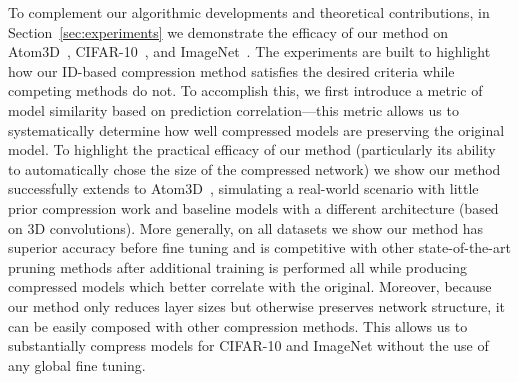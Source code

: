 To complement our algorithmic developments and theoretical contributions, in Section~\ref{sec:experiments} we demonstrate the efficacy of our method on Atom3D~\cite{atom3d}, CIFAR-10~\cite{datacifar10}, and ImageNet~\cite{deng2009imagenet}. The experiments are built to highlight how our ID-based compression method satisfies the desired criteria while competing methods do not. To accomplish this, we first introduce a metric of model similarity based on prediction correlation---this metric allows us to systematically determine how well compressed models are preserving the original model. To highlight the practical efficacy of our method (particularly its ability to automatically chose the size of the compressed network) we show our method successfully extends to Atom3D~\cite{atom3d}, simulating a real-world scenario with little prior compression work and baseline models with a different architecture (based on 3D convolutions). More generally, on all datasets we show our method has superior accuracy before fine tuning and is competitive with other state-of-the-art pruning methods after additional training is performed all while producing compressed models which better correlate with the original. Moreover, because our method only reduces layer sizes but otherwise preserves network structure, it can be easily composed with other compression 
methods. 
This allows us to substantially compress models for CIFAR-10 and ImageNet  without the use of any global fine tuning.




